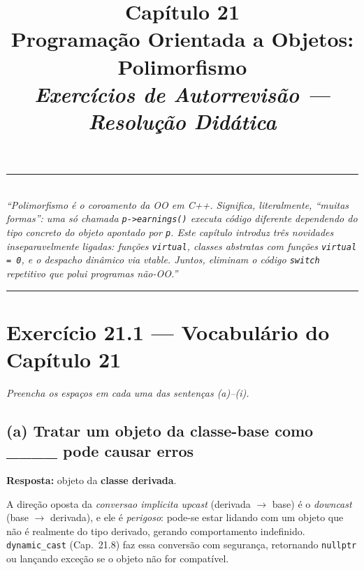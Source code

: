 \documentclass[11pt,a4paper]{article}
\title{
  \vspace{-1cm}
  {\Huge\bfseries\color{deitelblue} Cap\'itulo 21}\\[0.3em]
  {\Large\bfseries Programa\c{c}\~ao Orientada a Objetos: Polimorfismo}\\[0.8em]
  {\large\itshape Exerc\'icios de Autorrevis\~ao --- Resolu\c{c}\~ao Did\'atica}
}
\author{}
\date{}
\begin{document}
\maketitle
\thispagestyle{empty}
\vspace{-2em}

\begin{center}
\rule{0.85\textwidth}{0.5pt}\\[0.4em]
\textit{``Polimorfismo \'e o coroamento da OO em C++. Significa, literalmente, ``muitas formas'': uma s\'o chamada \texttt{p->earnings()} executa c\'odigo \emph{diferente} dependendo do tipo concreto do objeto apontado por \texttt{p}. Este cap\'itulo introduz tr\^es novidades inseparavelmente ligadas: fun\c{c}\~oes \texttt{virtual}, classes abstratas com fun\c{c}\~oes \texttt{virtual = 0}, e o despacho din\^amico via \emph{vtable}. Juntos, eliminam o c\'odigo \texttt{switch} repetitivo que polui programas n\~ao-OO.''}\\[0.4em]
\rule{0.85\textwidth}{0.5pt}
\end{center}

\vspace{1em}

\section{Exerc\'icio 21.1 --- Vocabul\'ario do Cap\'itulo 21}

\textit{Preencha os espa\c{c}os em cada uma das senten\c{c}as (a)--(i).}

\subsection*{(a) Tratar um objeto da classe-base como \_\_\_\_ pode causar erros}

\begin{resposta}\textbf{Resposta:} objeto da \textbf{classe derivada}.\end{resposta}

A dire\c{c}\~ao oposta da \emph{conversao implicita upcast} (derivada $\to$ base) \'e o \emph{downcast} (base $\to$ derivada), e ele \'e \emph{perigoso}: pode-se estar lidando com um objeto que n\~ao \'e realmente do tipo derivado, gerando comportamento indefinido. \texttt{dynamic\_cast} (Cap.~21.8) faz essa convers\~ao com seguran\c{c}a, retornando \texttt{nullptr} ou lan\c{c}ando exce\c{c}\~ao se o objeto n\~ao for compat\'ivel.
\end{document}
